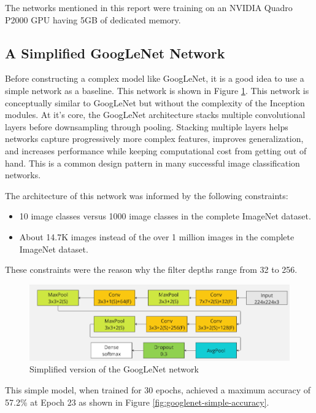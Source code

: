 \documentclass{article}
\begin{document}
The networks mentioned in this report were training on an NVIDIA Quadro P2000 GPU having 5GB of dedicated memory.

\subsection{A Simplified GoogLeNet Network}
Before constructing a complex model like GoogLeNet, it is a good idea to use a simple network as a baseline. This network is shown in Figure \ref{fig:cnn-simple}. This network is conceptually similar to GoogLeNet but without the complexity of the Inception modules. At it's core, the GoogLeNet architecture stacks multiple convolutional layers before downsampling through pooling. Stacking multiple layers helps networks capture progressively more complex features, improves generalization, and increases performance while keeping computational cost from getting out of hand. This is a common design pattern in many successful image classification networks\cite{simonyan2014very}.

The architecture of this network was informed by the following constraints:
\begin{itemize}
    \item 10 image classes versus 1000 image classes in the complete ImageNet dataset.
    \item About 14.7K images instead of the over 1 million images in the complete ImageNet dataset.
\end{itemize}

These constraints were the reason why the filter depths range from 32 to 256.


\begin{figure}[ht]
    \centering
    \includegraphics[scale=0.7]{project/paper_images/googlenet_simple.png}
    \caption{Simplified version of the GoogLeNet network}
    \label{fig:cnn-simple}
\end{figure}

This simple model, when trained for 30 epochs, achieved a maximum accuracy of 57.2\% at Epoch 23 as shown in Figure \ref{fig:googlenet-simple-accuracy}.
\end{document}
